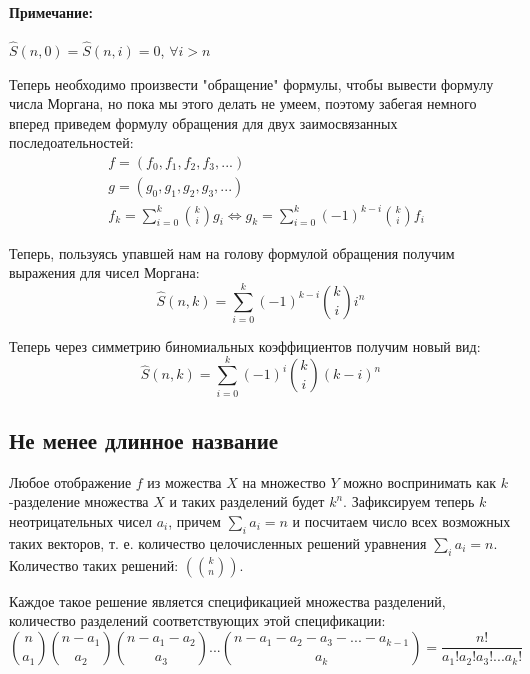 \paragraph{Примечание: } $\hat S \left(n,0\right) = \hat S \left(n,i\right) = 0$, $\forall i > n$

Теперь необходимо произвести "обращение" формулы, чтобы вывести формулу числа Моргана, но пока мы этого делать не умеем, поэтому забегая немного вперед приведем формулу обращения для двух заимосвязанных последоательностей:
\begin{equation}
	\begin{split}
	& f = \left(f_0, f_1, f_2, f_3, ...\right) \\
	& g = \left(g_0, g_1, g_2, g_3, ...\right) \\
	& f_k = \sum_{i=0}^k \binom{k}{i} g_i \Leftrightarrow g_k = \sum_{i=0}^k {\left(-1\right)}^{k-i}\binom{k}{i} f_i
	\end{split}
	\label{math::invert}
\end{equation}

Теперь, пользуясь упавшей нам на голову формулой обращения получим выражения для чисел Моргана:
\begin{equation}
\hat S \left(n,k\right) = \sum_{i=0}^k {\left(-1\right)}^{k-i} \binom{k}{i} i^n
\end{equation}

Теперь через симметрию биномиальных коэффициентов получим новый вид:
\begin{equation}
\hat S \left(n,k\right) = \sum_{i=0}^k {\left(-1\right)}^i\binom{k}{i} {\left(k-i\right)}^n
\end{equation}

\subsection{Не менее длинное название}

Любое отображение $f$ из можества $X$ на множество $Y$ можно воспринимать как $k$-разделение множества $X$ и таких разделений будет $k^n$. Зафиксируем теперь $k$ неотрицательных чисел $a_i$, причем $\sum_i a_i = n$ и посчитаем число всех возможных таких векторов, т. е. количество целочисленных решений уравнения $\sum_i a_i = n$. Количество таких решений: $\left(\binom{k}{n}\right)$.

Каждое такое решение является спецификацией множества разделений, количество разделений соответствующих этой спецификации:
\[
	\binom{n}{a_1}\binom{n-a_1}{a_2}\binom{n-a_1-a_2}{a_3}...\binom{n-a_1-a_2-a_3-...-a_{k-1}}{a_k} = \frac{n!}{a_1!a_2!a_3!...a_k!}
\]

